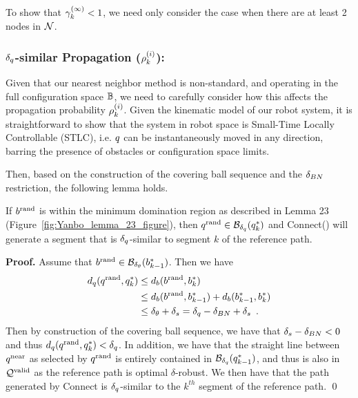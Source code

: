 To show that $\gamma_k^{(\infty)} < 1$, we need only consider the case when there are at least 2 nodes in $\mathcal{N}$.

\subsubsection{$\delta_q$-similar Propagation ($\rho_k^{(i)}$):}
\label{sec:prop}
Given that our nearest neighbor method is non-standard, and operating in the full configuration space $\mathbb{B}$, we need to carefully consider how this affects the propagation probability $\rho_k^{(i)}$. Given the kinematic model of our robot system, it is straightforward to show that the system in robot space is Small-Time Locally Controllable (STLC), i.e. $q$ can be instantaneously moved in any direction, barring the presence of obstacles or configuration space limits.  

Then, based on the construction of the covering ball sequence and the $\delta_{BN}$ restriction, the following lemma holds.

\begin{lemma}
    \label{lem:rand_to_next_dist}
    If $b^\textrm{rand}$ is within the minimum domination region as described in \cite{LiAOKP2016} Lemma 23 (Figure~\ref{fig:Yanbo_lemma_23_figure}), then $q^\textrm{rand} \in \mathcal{B}_{\delta_q}(q^*_k)$ and Connect() will generate a segment that is $\delta_q$-similar to segment $k$ of the reference path.
\end{lemma}



\noindent
{\bf Proof.}
Assume that $b^\textrm{rand} \in \mathcal{B}_{\delta_\theta}(b^*_{k-1})$. Then we have
\begin{align*}
    d_q(q^\textrm{rand}, q^*_k)  &\leq d_b(b^\textrm{rand}, b^*_k) \\
                                                        &\leq d_b(b^\textrm{rand}, b^*_{k-1}) + d_b(b^*_{k-1}, b^*_k) \\
                                                        &\leq \delta_\theta + \delta_s = \delta_q - \delta_{BN} + \delta_s \enspace.
\end{align*}
Then by construction of the covering ball sequence, we have that $\delta_s -\delta_{BN} < 0$ and thus $d_q(q^\textrm{rand}, q^*_k) < \delta_q$. In addition, we have that the straight line between $q^\textrm{near}$ as selected by $q^\textrm{rand}$ is entirely contained in $\mathcal{B}_{\delta_q}(q^*_{k-1})$, and thus is also in $\mathcal{Q}^{\textrm{valid}}$ as the reference path is optimal $\delta$-robust. We then have that the path generated by Connect is $\delta_q$-similar to the $k^{th}$ segment of the reference path.
\qed


